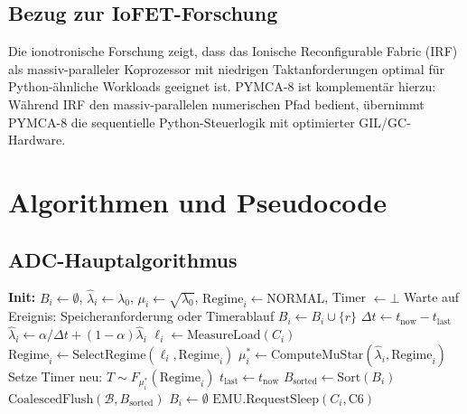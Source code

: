 ﻿\documentclass[a4paper,12pt]{scrreprt}
\theoremstyle{definition}
\begin{document}
	\subsection{Bezug zur IoFET-Forschung}
	
	Die ionotronische Forschung \cite{epp2026iono} zeigt, dass das Ionische
	Reconfigurable Fabric (IRF) als massiv-paralleler Koprozessor mit
	niedrigen Taktanforderungen optimal für Python-ähnliche Workloads
	geeignet ist. PYMCA-8 ist komplementär hierzu: Während IRF den
	massiv-parallelen numerischen Pfad bedient, übernimmt PYMCA-8 die
	sequentielle Python-Steuerlogik mit optimierter GIL/GC-Hardware.
	
	\section{Algorithmen und Pseudocode}
	
	\subsection{ADC-Hauptalgorithmus}
	
	\begin{algorithm}[H]
		\caption{Adaptive Distribution Controller (ADC) -- Kernalgorithmus}
		\label{alg:adc}
		\begin{algorithmic}[1]
			\State \textbf{Init:} $B_i \gets \emptyset$, $\hat\lambda_i \gets \lambda_0$,
			$\mu_i \gets \sqrt{\lambda_0}$, $\mathrm{Regime}_i \gets \mathrm{NORMAL}$,
			Timer $\gets \bot$
			\Repeat
			\State Warte auf Ereignis: Speicheranforderung oder Timerablauf
			\State $B_i \gets B_i \cup \{r\}$
			\State $\Delta t \gets t_{\mathrm{now}} - t_{\mathrm{last}}$
			\State $\hat\lambda_i \gets \alpha / \Delta t + (1-\alpha) \hat\lambda_i$
			\State $\ell_i \gets \mathrm{MeasureLoad}(C_i)$
			\State $\mathrm{Regime}_i \gets \mathrm{SelectRegime}(\ell_i,
			\mathrm{Regime}_i)$
			\State $\mu_i^* \gets \mathrm{ComputeMuStar}(\hat\lambda_i, \mathrm{Regime}_i)$
			\State Setze Timer neu: $T \sim F_{\mu_i^*}(\mathrm{Regime}_i)$
			\State $t_{\mathrm{last}} \gets t_{\mathrm{now}}$
			\State $B_{\mathrm{sorted}} \gets \mathrm{Sort}(B_i)$
			\State $\mathrm{CoalescedFlush}(\mathcal{B}, B_{\mathrm{sorted}})$
			\State $B_i \gets \emptyset$
			\EndIf
			\State $\mathrm{EMU.RequestSleep}(C_i, \mathrm{C6})$
			\EndIf
			\EndIf
		\end{algorithmic}
	\end{algorithm}
\end{document}
